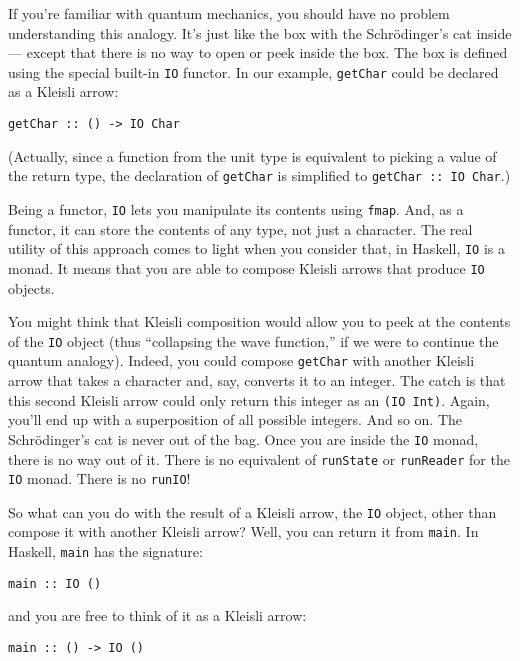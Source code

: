 If you're familiar with quantum mechanics, you should have no problem
understanding this analogy. It's just like the box with the
Schrödinger's cat inside --- except that there is no way to open or peek
inside the box. The box is defined using the special built-in
\texttt{IO} functor. In our example, \texttt{getChar} could be declared
as a Kleisli arrow:

\begin{verbatim}
getChar :: () -> IO Char
\end{verbatim}

(Actually, since a function from the unit type is equivalent to picking
a value of the return type, the declaration of \texttt{getChar} is
simplified to \texttt{getChar\ ::\ IO\ Char}.)

Being a functor, \texttt{IO} lets you manipulate its contents using
\texttt{fmap}. And, as a functor, it can store the contents of any type,
not just a character. The real utility of this approach comes to light
when you consider that, in Haskell, \texttt{IO} is a monad. It means
that you are able to compose Kleisli arrows that produce \texttt{IO}
objects.

You might think that Kleisli composition would allow you to peek at the
contents of the \texttt{IO} object (thus ``collapsing the wave
function,'' if we were to continue the quantum analogy). Indeed, you
could compose \texttt{getChar} with another Kleisli arrow that takes a
character and, say, converts it to an integer. The catch is that this
second Kleisli arrow could only return this integer as an
\texttt{(IO\ Int)}. Again, you'll end up with a superposition of all
possible integers. And so on. The Schrödinger's cat is never out of the
bag. Once you are inside the \texttt{IO} monad, there is no way out of
it. There is no equivalent of \texttt{runState} or \texttt{runReader}
for the \texttt{IO} monad. There is no \texttt{runIO}!

So what can you do with the result of a Kleisli arrow, the \texttt{IO}
object, other than compose it with another Kleisli arrow? Well, you can
return it from \texttt{main}. In Haskell, \texttt{main} has the
signature:

\begin{verbatim}
main :: IO ()
\end{verbatim}

and you are free to think of it as a Kleisli arrow:

\begin{verbatim}
main :: () -> IO ()
\end{verbatim}

